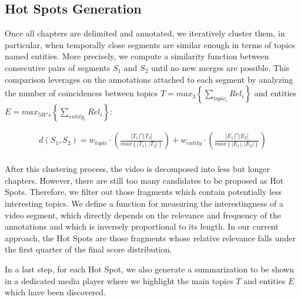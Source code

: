 \documentclass{llncs}
\begin{document}
\subsection{Hot Spots Generation}
\label{sec:hotspots-generation}
Once all chapters are delimited and annotated, we iteratively cluster them, in particular, when temporally close segments are similar enough in terms of topics named entities. More precisely, we compute a similarity function between consecutive pairs of segments $S_1$ and $S_2$ until no new merges are possible. This comparison leverages on the annotations attached to each segment by analyzing the number of coincidences between topics $T = max_{3}\left \{ \sum_{topic_{i}} Rel_{i} \right \}$ and entities $E = max_{5W's}\left \{ \sum_{entity_{i}} Rel_{i} \right  \}$:

\begin{equation}
\begin{split}
d\left ( S_{1} , S_{2} \right ) = w_{topic}\cdot \left ( \frac{\left | T_{1} \bigcap T_{2} \right |}{max \left \{ \left | T_{1} \right |, \left | T_{2} \right |\right \}} \right ) + w_{entity}\cdot \left ( \frac{\left | E_{1} \bigcap E_{2} \right |}{max \left \{ \left | E_{1} \right |, \left | E_{2} \right |\right \}} \right ) \\
\end{split}
\end{equation}

After this clustering process, the video is decomposed into less but longer chapters. However, there are still too many candidates to be proposed as Hot Spots. Therefore, we filter out those fragments which contain potentially less interesting topics. We define a function for measuring the interestingness of a video segment, which directly depends on the relevance and frequency of the annotations and which is inversely proportional to its length. In our current approach, the Hot Spots are those fragments whose relative relevance falls under the first quarter of the final score distribution.


In a last step, for each Hot Spot, we also generate a summarization to be shown in a dedicated media player where we highlight the main topics $T$ and entities $E$ which have been discovered.
\end{document}

